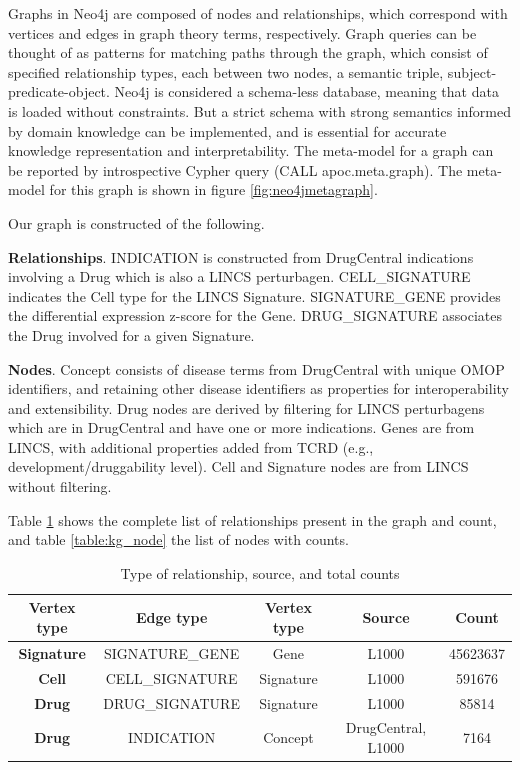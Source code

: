 Graphs in Neo4j are composed of nodes and relationships, which correspond with vertices and edges in graph theory terms, respectively. Graph queries can be thought of as patterns for matching paths through the graph, which consist of specified relationship types, each between two nodes, a semantic triple, subject-predicate-object. Neo4j is considered a schema-less database, meaning that data is loaded without constraints. But a strict schema with strong semantics informed by domain knowledge can be implemented, and is essential for accurate knowledge representation and interpretability. The meta-model for a graph can be reported by introspective Cypher query (CALL apoc.meta.graph). The meta-model for this graph is shown in figure \ref{fig:neo4jmetagraph}.

Our graph is constructed of the following.

\textbf{Relationships}. INDICATION is constructed from DrugCentral indications  involving a Drug which is also a LINCS perturbagen. CELL\_SIGNATURE indicates the Cell type for the LINCS Signature. SIGNATURE\_GENE provides the differential expression z-score for the Gene. DRUG\_SIGNATURE associates the Drug involved for a given Signature.

\textbf{Nodes}. Concept consists of disease terms from DrugCentral with unique OMOP\cite{Hripcsak2019-ho} identifiers, and retaining other disease identifiers as properties for interoperability and extensibility. Drug nodes are derived by filtering for LINCS perturbagens which are in DrugCentral and have one or more indications.  Genes are from LINCS, with additional properties added from TCRD (e.g., development/druggability level). Cell and Signature nodes are from LINCS without filtering.

Table \ref{table:kg_rel} shows the complete list of relationships present in the graph and count, and table \ref{table:kg_node} the list of nodes with counts.

\begin{table}
\caption{Type of relationship, source, and total counts}
\begin{center}
\begin{tabular}{ |c|c|c|c|c| } 
\hline
\textbf{Vertex type} & \textbf{Edge type} & \textbf{Vertex type} & \textbf{Source} & \textbf{Count}\\ 
\hline
\textbf{Signature} & SIGNATURE\_GENE & Gene & L1000 & 45623637\\ 
\hline
\textbf{Cell} & CELL\_SIGNATURE & Signature & L1000 & 591676\\ 
\hline
\textbf{Drug} & DRUG\_SIGNATURE & Signature & L1000 & 85814\\ 
\hline
\textbf{Drug} & INDICATION & Concept & DrugCentral, L1000 & 7164\\ 
\hline
\end{tabular}
\end{center}
\label{table:kg_rel}
\end{table}

